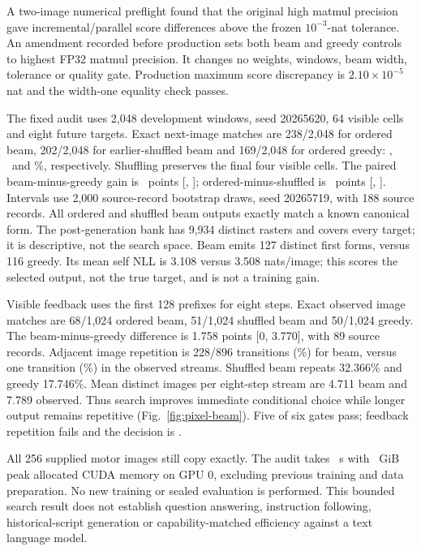 \documentclass[10pt,a4paper]{article}
\begin{document}
A two-image numerical preflight found that the original high matmul precision
gave incremental/parallel score differences above the frozen $10^{-3}$-nat
tolerance. An amendment recorded before production sets both beam and greedy
controls to highest FP32 matmul precision. It changes no weights, windows,
beam width, tolerance or quality gate. Production maximum score discrepancy
is $2.10\times10^{-5}$ nat and the width-one equality check passes.

The fixed audit uses 2,048 development windows, seed 20265620, 64 visible cells
and eight future targets. Exact next-image matches are 238/2,048 for ordered
beam, 202/2,048 for earlier-shuffled beam and 169/2,048 for ordered greedy:
\BeamAccuracy, \BeamShuffled\ and \GreedyAccuracy\%, respectively. Shuffling
preserves the final four visible cells. The paired beam-minus-greedy gain is
\BeamGain\ points [\BeamGainLow, \BeamGainHigh]; ordered-minus-shuffled is
\BeamHistoryGain\ points [\BeamHistoryLow, \BeamHistoryHigh]. Intervals use
2,000 source-record bootstrap draws, seed 20265719, with 188 source records.
All ordered and shuffled beam outputs exactly match a known canonical form.
The post-generation bank has 9,934 distinct rasters and covers every target;
it is descriptive, not the search space. Beam emits 127 distinct first forms,
versus 116 greedy. Its mean self NLL is 3.108 versus 3.508 nats/image; this
scores the selected output, not the true target, and is not a training gain.

Visible feedback uses the first 128 prefixes for eight steps. Exact observed
image matches are 68/1,024 ordered beam, 51/1,024 shuffled beam and 50/1,024
greedy. The beam-minus-greedy difference is 1.758 points [0, 3.770], with 89
source records. Adjacent image repetition is 228/896 transitions
(\BeamRepeat\%) for beam, versus one transition (\TargetRepeat\%) in the
observed streams. Shuffled beam repeats 32.366\% and greedy 17.746\%.
Mean distinct images per eight-step stream are 4.711 beam and 7.789 observed.
Thus search improves immediate conditional choice while longer output remains
repetitive (Fig.~\ref{fig:pixel-beam}). Five of six gates pass; feedback
repetition fails and the decision is \texttt{\BeamDecision}.

All 256 supplied motor images still copy exactly. The audit takes
\BeamSeconds\ s with \BeamMemory\ GiB peak allocated CUDA memory on GPU 0,
excluding previous training and data preparation. No new training or sealed
evaluation is performed. This bounded search result does not establish
question answering, instruction following, historical-script generation or
capability-matched efficiency against a text language model.
\end{document}
